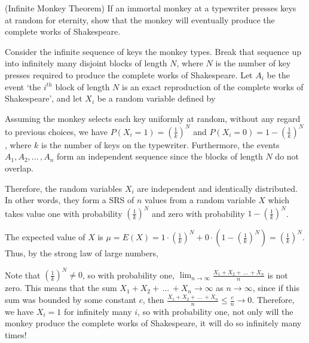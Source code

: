 \begin{examp} (Infinite Monkey Theorem) If an immortal monkey at a typewriter presses keys at random for eternity, show that the monkey will eventually produce the complete works of Shakespeare.
\par
\noindent Consider the infinite sequence of keys the monkey types. Break that sequence up into infinitely many disjoint blocks of length $N$, where $N$ is the number of key presses required to produce the complete works of Shakespeare. Let $A_i$ be the event `the $i^{th}$ block of length $N$ is an exact reproduction of the complete works of Shakespeare', and let $X_i$ be a random variable defined by
\par
\noindent Assuming the monkey selects each key uniformly at random, without any regard to previous choices, we have $P(X_i = 1) = (\frac{1}{k})^N$ and $P(X_i = 0) = 1 - (\frac{1}{k})^N$, where $k$ is the number of keys on the typewriter. Furthermore, the events $A_1, A_2, ... \,, A_n$ form an independent sequence since the blocks of length $N$ do not overlap.
\par
\noindent Therefore, the random variables $X_i$ are independent and identically distributed. In other words, they form a SRS of $n$ values from a random variable $X$ which takes value one with probability $(\frac{1}{k})^N$ and zero with probability $1 - (\frac{1}{k})^N$.
\par
\noindent The expected value of $X$ is $\mu = E(X) = 1 \cdot (\frac{1}{k})^N + 0 \cdot (1- (\frac{1}{k})^N) = (\frac{1}{k})^N$. Thus, by the strong law of large numbers,
\par
\noindent Note that $\left(\frac{1}{k}\right)^N \neq 0$, so with probability one, $\lim_{n \to \infty} \frac{X_1+X_2+\,...\,+X_n}{n}$ is not zero. This means that the sum $X_1+X_2+\,...\,+X_n \to \infty$ as $n \to \infty$, since if this sum was bounded by some constant $c$, then $\frac{X_1+X_2+\,...\,+X_n}{n} \leq \frac{c}{n} \to 0$. Therefore, we have $X_i = 1$ for infinitely many $i$, so with probability one, not only will the monkey produce the complete works of Shakespeare, it will do so infinitely many times!
\end{examp}
